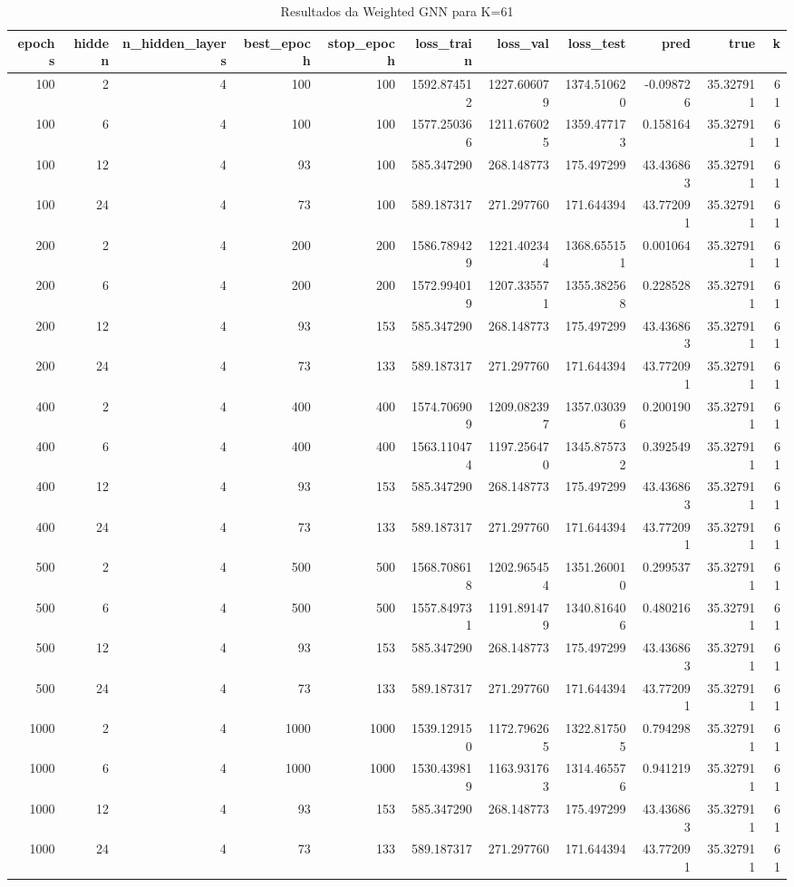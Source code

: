 \begin{table}
\caption{Resultados da Weighted GNN para K=61}
\label{tab:weighted_gnn_results_k61}
\begin{tabular}{rrrrrrrrrrr}
\toprule
epochs & hidden & n\_hidden\_layers & best\_epoch & stop\_epoch & loss\_train & loss\_val & loss\_test & pred & true & k \\
\midrule
100 & 2 & 4 & 100 & 100 & 1592.874512 & 1227.606079 & 1374.510620 & -0.098726 & 35.327911 & 61 \\
100 & 6 & 4 & 100 & 100 & 1577.250366 & 1211.676025 & 1359.477173 & 0.158164 & 35.327911 & 61 \\
100 & 12 & 4 & 93 & 100 & 585.347290 & 268.148773 & 175.497299 & 43.436863 & 35.327911 & 61 \\
100 & 24 & 4 & 73 & 100 & 589.187317 & 271.297760 & 171.644394 & 43.772091 & 35.327911 & 61 \\
200 & 2 & 4 & 200 & 200 & 1586.789429 & 1221.402344 & 1368.655151 & 0.001064 & 35.327911 & 61 \\
200 & 6 & 4 & 200 & 200 & 1572.994019 & 1207.335571 & 1355.382568 & 0.228528 & 35.327911 & 61 \\
200 & 12 & 4 & 93 & 153 & 585.347290 & 268.148773 & 175.497299 & 43.436863 & 35.327911 & 61 \\
200 & 24 & 4 & 73 & 133 & 589.187317 & 271.297760 & 171.644394 & 43.772091 & 35.327911 & 61 \\
400 & 2 & 4 & 400 & 400 & 1574.706909 & 1209.082397 & 1357.030396 & 0.200190 & 35.327911 & 61 \\
400 & 6 & 4 & 400 & 400 & 1563.110474 & 1197.256470 & 1345.875732 & 0.392549 & 35.327911 & 61 \\
400 & 12 & 4 & 93 & 153 & 585.347290 & 268.148773 & 175.497299 & 43.436863 & 35.327911 & 61 \\
400 & 24 & 4 & 73 & 133 & 589.187317 & 271.297760 & 171.644394 & 43.772091 & 35.327911 & 61 \\
500 & 2 & 4 & 500 & 500 & 1568.708618 & 1202.965454 & 1351.260010 & 0.299537 & 35.327911 & 61 \\
500 & 6 & 4 & 500 & 500 & 1557.849731 & 1191.891479 & 1340.816406 & 0.480216 & 35.327911 & 61 \\
500 & 12 & 4 & 93 & 153 & 585.347290 & 268.148773 & 175.497299 & 43.436863 & 35.327911 & 61 \\
500 & 24 & 4 & 73 & 133 & 589.187317 & 271.297760 & 171.644394 & 43.772091 & 35.327911 & 61 \\
1000 & 2 & 4 & 1000 & 1000 & 1539.129150 & 1172.796265 & 1322.817505 & 0.794298 & 35.327911 & 61 \\
1000 & 6 & 4 & 1000 & 1000 & 1530.439819 & 1163.931763 & 1314.465576 & 0.941219 & 35.327911 & 61 \\
1000 & 12 & 4 & 93 & 153 & 585.347290 & 268.148773 & 175.497299 & 43.436863 & 35.327911 & 61 \\
1000 & 24 & 4 & 73 & 133 & 589.187317 & 271.297760 & 171.644394 & 43.772091 & 35.327911 & 61 \\
\bottomrule
\end{tabular}
\end{table}
